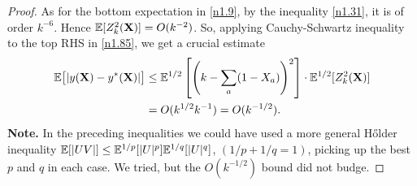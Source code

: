 \documentclass[11pt]{amsart}
\theoremstyle{remark}
\numberwithin{equation}{section}
\begin{document}
\begin{proof}
As for the bottom expectation in \eqref{n1.9}, by the inequality \eqref{n1.31}, it is of order $k^{-6}$.
Hence $\Bbb E[Z_k^2(\bold X)]=O(k^{-2})$. So, applying Cauchy-Schwartz inequality to the top RHS in \eqref{n1.85},
we get a crucial estimate
\begin{equation}\label{n1.86}
\begin{aligned}
\Bbb E\bigl[|y(\bold X)-y^*(\bold X)|\bigr]&\le \Bbb E^{1/2}\left[\left(k-\sum_a(1-X_a)\right)^2\right]\cdot 
\Bbb E^{1/2}[Z_k^2(\bold X)]\\
&=O(k^{1/2} k^{-1})=O(k^{-1/2}).
\end{aligned}
\end{equation}
{\bf Note.\/} In the preceding inequalities we could have used a more general H\H older  inequality $\Bbb E[|UV|]
\le \Bbb E^{1/p}[|U|^p]\Bbb E^{1/q}[|U|^q]$, $(1/p+1/q=1)$, picking up the best $p$ and $q$ in each case. We tried, but the $O(k^{-1/2})$ bound did not budge. 


\end{proof}
\end{document}
